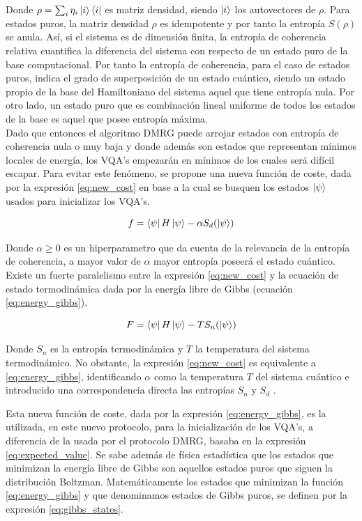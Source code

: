 Donde $\rho=\sum_{i} \eta_{i} \ket{i}\bra{i}$ es matriz densidad, siendo $\ket{i}$ los autovectores de $\rho$. Para estados puros, la matriz densidad $\rho$ es idempotente y por tanto la entropía $S(\rho)$ se anula. Así, si el sistema es de dimensión finita, la entropía de coherencia relativa cuantifica la diferencia del sistema con respecto de un estado puro de la base computacional. Por tanto la entropía de coherencia, para el caso de estados puros, indica el grado de superposición de un estado cuántico, siendo un estado propio de la base del Hamiltoniano del sistema aquel que tiene entropía nula. Por otro lado, un estado puro que es combinación lineal uniforme de todos los estados de la base es aquel que posee entropía máxima.\\

Dado que entonces el algoritmo DMRG puede arrojar estados con entropía de coherencia nula o muy baja y donde además son estados que representan mínimos locales de energía, los VQA's empezarán en mínimos de los cuales será difícil escapar. Para evitar este fenómeno, se propone una nueva función de coste, dada por la expresión \ref{eq:new_cost} en base a la cual se busquen los estados $\ket{\psi}$ usados para inicializar los VQA's. 

\begin{equation}
    f = \bra{\psi}H\ket{\psi} - \alpha S_{d}(\ket{\psi})
    \label{eq:new_cost}
\end{equation}

Donde $\alpha\geq 0$ es un hiperparametro que da cuenta de la relevancia de la entropía de coherencia, a mayor valor de $\alpha$ mayor entropía poseerá el estado cuántico. Existe un fuerte paralelismo entre la expresión \ref{eq:new_cost} y la ecuación de estado termodinámica dada por la energía libre de Gibbs (ecuación \ref{eq:energy_gibbs}).

\begin{equation}
    F = \bra{\psi}H\ket{\psi} - T S_{n}(\ket{\psi})
    \label{eq:energy_gibbs}
\end{equation}

Donde $S_{n}$ es la entropía termodinámica y $T$ la temperatura del sistema termodinámico. No obstante, la expresión \ref{eq:new_cost} es equivalente a \ref{eq:energy_gibbs}, identificando $\alpha$ como la temperatura $T$ del sistema cuántico e introducido una correspondencia directa las entropías $S_{n}$  y $S_{d}$ \citep{polkovnikov}. 

\newpage

Esta nueva función de coste, dada por la expresión \ref{eq:energy_gibbs}, es la utilizada, en este nuevo protocolo, para la inicialización de los VQA's, a diferencia de la usada por el protocolo DMRG, basaba en la expresión \ref{eq:expected_value}. Se sabe además de física estadística que los estados que minimizan la energía libre de Gibbs son aquellos estados puros que siguen la distribución Boltzman. Matemáticamente los estados que minimizan la función \ref{eq:energy_gibbs} y que denominamos estados de Gibbs puros, se definen por la expresión \ref{eq:gibbs_states}.

